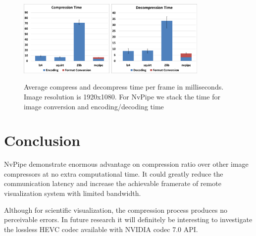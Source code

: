 \documentclass{vgtc}                          %
\begin{document}
\begin{figure}[htb]
  \label{figure:time}
  \centering
  \includegraphics[width=1.8in]{encodingTime.eps}
  \includegraphics[width=1.8in]{decodingTime.eps}
  \caption{Average compress and decompress time per frame in milliseconds. Image resolution is 1920x1080. For NvPipe we stack the time for image conversion and encoding/decoding time}
\end{figure}

\section{Conclusion}

NvPipe demonstrate enormous advantage on compression ratio over other image compressors at no extra computational time. It could greatly reduce the communication latency and increase the achievable framerate of remote visualization system with limited bandwidth.

Although for scientific visualization, the compression process produces no perceivable errors. In future research it will definitely be interesting to investigate the lossless HEVC codec available with NVIDIA codec 7.0 API.



\nocite{*}

\end{document}

